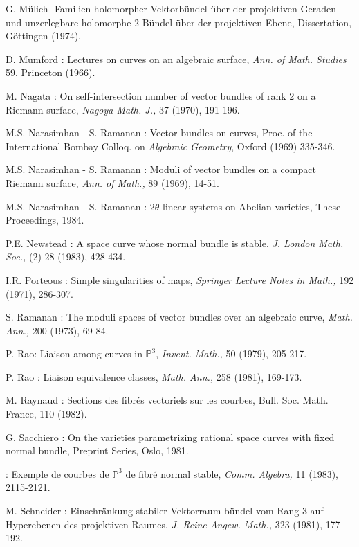\begin{thebibliography}{}
 G. M\"ulich\pageoriginale - Familien holomorpher Vektorb\"undel \"uber der projektiven Geraden und unzerlegbare holomorphe 2-B\"undel \"uber der projektiven Ebene, Dissertation, G\"ottingen (1974).

 D. Mumford : Lectures on curves on an algebraic surface, {\em Ann. of Math. Studies} 59, Princeton (1966).

 M. Nagata : On self-intersection number of vector bundles of rank 2 on a Riemann surface, {\em Nagoya Math. J.,} 37 (1970), 191-196.

 M.S. Narasimhan - S. Ramanan : Vector bundles on curves, Proc. of the International Bombay Colloq. on {\em Algebraic Geometry}, Oxford (1969) 335-346.

 M.S. Narasimhan - S. Ramanan : Moduli of vector bundles on a compact Riemann surface, {\em Ann. of Math.,} 89 (1969), 14-51.

 M.S. Narasimhan - S. Ramanan : $2\theta$-linear systems on Abelian varieties, These Proceedings, 1984.

 P.E. Newstead : A space curve whose normal bundle is stable, {\em J. London Math. Soc.,} (2) 28 (1983), 428-434. 

 I.R. Porteous : Simple singularities of maps, {\em Springer Lecture Notes in Math.,} 192 (1971), 286-307.

 S. Ramanan : The moduli spaces of vector bundles over an algebraic curve, {\em Math. Ann.,} 200 (1973), 69-84.

 P. Rao\pageoriginale : Liaison among curves in $\mathbb{P}^{3}$, {\em Invent. Math.,} 50 (1979), 205-217. 

 P. Rao : Liaison equivalence classes, {\em Math. Ann.,} 258 (1981), 169-173.

  M. Raynaud : Sections des fibr\'es vectoriels sur les courbes, Bull. Soc. Math. France, 110 (1982). 

 G. Sacchiero : On the varieties parametrizing rational space curves with fixed normal bundle, Preprint Series, Oslo, 1981.

 : Exemple de courbes de $\mathbb{P}^{3}$ de fibr\'e normal stable, {\em Comm. Algebra,} 11 (1983), 2115-2121. 

 M. Schneider : Einschr\"ankung stabiler Vektorraum-b\"undel vom Rang 3 auf Hyperebenen des projektiven Raumes, {\em J. Reine Angew. Math.,} 323 (1981), 177-192.


\end{thebibliography}
